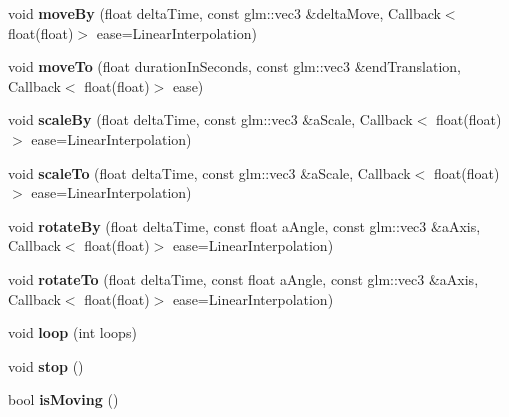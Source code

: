 \begin{DoxyCompactItemize}
void {\bfseries move\+By} (float delta\+Time, const glm\+::vec3 \&delta\+Move, Callback$<$ float(float)$>$ ease=Linear\+Interpolation)
\item 
\mbox{\label{classflw_1_1flf_1_1Moveable_aad500d2e518a47257df185a7f5f3806f}} 
void {\bfseries move\+To} (float duration\+In\+Seconds, const glm\+::vec3 \&end\+Translation, Callback$<$ float(float)$>$ ease)
\item 
\mbox{\label{classflw_1_1flf_1_1Moveable_ab07cf0192e75b9f69750fd87c8c7866e}} 
void {\bfseries scale\+By} (float delta\+Time, const glm\+::vec3 \&a\+Scale, Callback$<$ float(float)$>$ ease=Linear\+Interpolation)
\item 
\mbox{\label{classflw_1_1flf_1_1Moveable_a238e63cfef384021f3077d08febaa59d}} 
void {\bfseries scale\+To} (float delta\+Time, const glm\+::vec3 \&a\+Scale, Callback$<$ float(float)$>$ ease=Linear\+Interpolation)
\item 
\mbox{\label{classflw_1_1flf_1_1Moveable_ac85e2a0f7883e6855579fea8e4a1878a}} 
void {\bfseries rotate\+By} (float delta\+Time, const float a\+Angle, const glm\+::vec3 \&a\+Axis, Callback$<$ float(float)$>$ ease=Linear\+Interpolation)
\item 
\mbox{\label{classflw_1_1flf_1_1Moveable_a90d21b40d1663d883b5ab56f09ee7444}} 
void {\bfseries rotate\+To} (float delta\+Time, const float a\+Angle, const glm\+::vec3 \&a\+Axis, Callback$<$ float(float)$>$ ease=Linear\+Interpolation)
\item 
\mbox{\label{classflw_1_1flf_1_1Moveable_a07f8394404d87b2f29d587bb0f9d4af5}} 
void {\bfseries loop} (int loops)
\item 
\mbox{\label{classflw_1_1flf_1_1Moveable_a93501ee996f78e5c6196f36231e3ff11}} 
void {\bfseries stop} ()
\item 
\mbox{\label{classflw_1_1flf_1_1Moveable_a1180f5939d8d3b0bd61bea57601aef9c}} 
bool {\bfseries is\+Moving} ()
\item 
\mbox{\label{classflw_1_1flf_1_1Moveable_a5dd8220a933d476aa2a1be62b18b6e78}} 

\end{DoxyCompactItemize}
